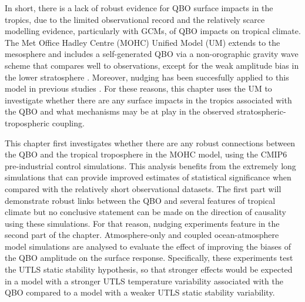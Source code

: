 In short, there is a lack of robust evidence for QBO surface impacts in the tropics, due to the limited observational record and the relatively scarce modelling evidence, particularly with GCMs, of QBO impacts on tropical climate.
 The Met Office Hadley Centre (MOHC) Unified Model (UM) extends to the mesosphere and includes a self-generated QBO via a non-orographic gravity wave scheme that compares well to observations, except for the weak amplitude bias in the lower stratosphere \citep{richter2020}. Moreover, nudging has been succesfully applied to this model in previous studies \citep{telford2008description,gray2020}. For these reasons, this chapter uses the UM to investigate whether there are any surface impacts in the tropics associated with the QBO and what mechanisms may be at play in the observed stratospheric-tropospheric coupling.



This chapter first investigates whether there are any robust connections between the QBO and the tropical troposphere in the MOHC model, using the CMIP6 pre-industrial control simulations.  This analysis benefits from the extremely long simulations that can provide improved estimates of statistical significance when compared with the relatively short observational datasets. The first part will demonstrate robust links between the QBO and several features of tropical climate but no conclusive statement can be made on the direction of causality using these simulations. For that reason, nudging experiments feature in the second part of the chapter. Atmosphere-only and coupled ocean-atmosphere model simulations are analysed to evaluate the effect of improving the biases of the QBO amplitude on the surface response. Specifically, these experiments test the UTLS static stability hypothesis, so that stronger effects would be expected in a model with a stronger UTLS temperature variability associated with the QBO compared to a model with a weaker UTLS static stability variability.


